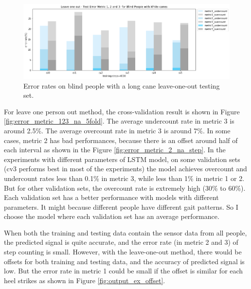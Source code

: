 \documentclass[11pt]{article}
\begin{document}
{\begin{figure}[ht]
\centering
\includegraphics[scale=0.5]{error_metric_wc_10fold_test4000}
\caption{Error rates on blind people with a long cane leave-one-out testing set.}
\label{fig:error_metric_wc_10fold_test4000}
\end{figure}

For leave one person out method, the cross-validation result is shown in Figure \ref{fig:error_metric_123_na_5fold}.
The average undercount rate in metric 3 is around 2.5\%. The average overcount rate in metric 3 is around 7\%.
In some cases, metric 2 has bad performances, because there is an offset around half of each interval as shown in the Figure \ref{fig:error_metric_2_na_step}. 
In the experiments with different parameters of LSTM model, on some validation sets (cv3 performs best in most of the experiments) the model achieves overcount and undercount rates less than 0.1\% in metric 3, while less than 1\% in metric 1 or 2. But for other validation sets, the overcount rate is extremely high (30\% to 60\%). Each validation set has a better performance with models with different parameters. It might because different people have different gait patterns. So I choose the model where each validation set has an average performance. 

When both the training and testing data contain the sensor data from all people, the predicted signal is quite accurate, and the error rate (in metric 2 and 3) of step counting is small. However, with the leave-one-out method, there would be offsets for both training and testing data, and the accuracy of predicted signal is low. But the error rate in metric 1 could be small if the offset is similar for each heel strikes as shown in Figure \ref{fig:output_ex_offset}. 

}
\end{document}
